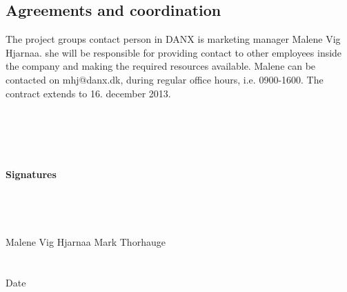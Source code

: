 \documentclass[pdftext, 12pt, a4paper]{report}
\begin{document}
\subsection*{Agreements and coordination}
The project groups contact person in DANX is marketing manager Malene Vig Hjarnaa. she will be responsible for providing contact to other employees inside the company and making the required resources available. Malene can be contacted on mhj@danx.dk, during regular office hours, i.e. 0900-1600. The contract extends to 16. december 2013.
\\ \\ \\ \\ \\ \\
\textbf{Signatures}
\\ \\ \\ \\
\underline{\hspace{9em}} \hspace*{12.8em} \underline{\hspace{9em}}
\\
Malene Vig Hjarnaa \hspace*{13em} Mark Thorhauge
\\ \\ \\
Date \underline{\hspace{9em}}
\end{document}
